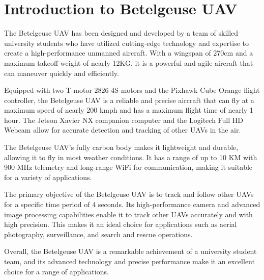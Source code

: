 \documentclass{article}
\begin{document}
\section{Introduction to Betelgeuse UAV}

The Betelgeuse UAV has been designed and developed by a team of skilled university students who have utilized cutting-edge technology and expertise to create a high-performance unmanned aircraft. With a wingspan of 270cm and a maximum takeoff weight of nearly 12KG, it is a powerful and agile aircraft that can maneuver quickly and efficiently.

Equipped with two T-motor 2826 4S motors and the Pixhawk Cube Orange flight controller, the Betelgeuse UAV is a reliable and precise aircraft that can fly at a maximum speed of nearly 200 kmph and has a maximum flight time of nearly 1 hour. The Jetson Xavier NX companion computer and the Logitech Full HD Webcam allow for accurate detection and tracking of other UAVs in the air.

The Betelgeuse UAV's fully carbon body makes it lightweight and durable, allowing it to fly in most weather conditions. It has a range of up to 10 KM with 900 MHz telemetry and long-range WiFi for communication, making it suitable for a variety of applications.

The primary objective of the Betelgeuse UAV is to track and follow other UAVs for a specific time period of 4 seconds. Its high-performance camera and advanced image processing capabilities enable it to track other UAVs accurately and with high precision. This makes it an ideal choice for applications such as aerial photography, surveillance, and search and rescue operations.

Overall, the Betelgeuse UAV is a remarkable achievement of a university student team, and its advanced technology and precise performance make it an excellent choice for a range of applications.
\end{document}

